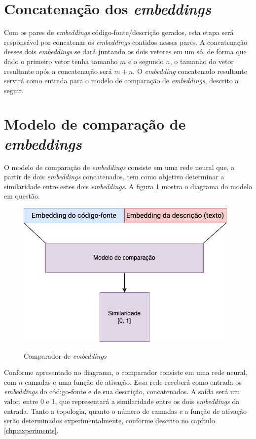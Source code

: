 \section{Concatenação dos \textit{embeddings}} 
\label{sec:methodology:embeddings-concat}
Com os pares de \textit{embeddings} código-fonte/descrição gerados, esta etapa será responsável por concatenar os \textit{embeddings} contidos nesses pares. 
A concatenação desses dois \textit{embeddings} se dará juntando os dois vetores em um só, de forma que dado o primeiro vetor tenha tamanho $m$ e o segundo $n$, o tamanho do vetor resultante após a concatenação será $m + n$.
O \textit{embedding} concatenado resultante servirá como entrada para o modelo de comparação de \textit{embeddings}, descrito a seguir.

\section{Modelo de comparação de \textit{embeddings}}
\label{sec:methodology:embedding-comparator}
O modelo de comparação de \textit{embeddings} consiste em uma rede neural que, a partir de dois \textit{embeddings} concatenados, tem como objetivo determinar a similaridade entre estes dois \textit{embeddings}. A figura \ref{fig:metodology-embeddings_comparator} mostra o diagrama do modelo em questão.

\begin{figure}[htbp]
    \centering
        \caption{Comparador de \textit{embeddings}}
        \includegraphics[scale=0.6]{emb-comparator.png}
        \label{fig:metodology-embeddings_comparator}
\end{figure}

Conforme apresentado no diagrama, o comparador consiste em uma rede neural, com $n$ camadas e uma função de ativação. Essa rede receberá como entrada os \textit{embeddings} do código-fonte e de sua descrição, concatenados. A saída será um valor, entre 0 e 1, que representará a similaridade entre os dois \textit{embeddings} da entrada. Tanto a topologia, quanto o número de camadas e a função de ativação serão determinados experimentalmente, conforme descrito no capítulo \ref{chp:experiments}.

